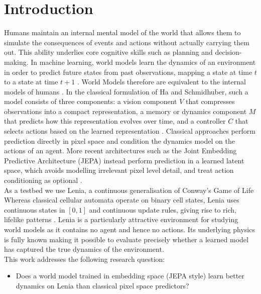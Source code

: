 \section{Introduction}
Humans maintain an internal mental model of the world that allows them to simulate the consequences of events and actions without actually carrying them out.
This ability underlies core cognitive skills such as planning and decision-making.
In machine learning, world models learn the dynamics of an environment in order to predict future states from past observations, mapping a state at time $t$ to a state at time $t+1$ \parencite{https://doi.org/10.5281/zenodo.1207631}.
World Models therefore are equivalent to the internal models of humans \parencite{lecun2022path}.
In the classical formulation of Ha and Schmidhuber, such a model consists of three components: a vision component $V$ that compresses observations into a compact representation, a memory or dynamics component $M$ that predicts how this representation evolves over time, and a controller $C$ that selects actions based on the learned representation \parencite{https://doi.org/10.5281/zenodo.1207631}.
Classical approaches perform prediction directly in pixel space and condition the dynamics model on the actions of an agent.
More recent architectures such as the Joint Embedding Predictive Architecture (JEPA) instead perform prediction in a learned latent space, which avoids modelling irrelevant pixel level detail, and treat action conditioning as optional \parencite{lecun2022path}.
\\

As a testbed we use Lenia, a continuous generalisation of Conway's Game of Life \parencite{Chan2019Lenia, 9dca666c-8536-3d47-b0e4-6be2acc6bf4e}
Whereas classical cellular automata operate on binary cell states, Lenia uses continuous states in $[0,1]$ and continuous update rules, giving rise to rich, lifelike patterns \parencite{Chan2019Lenia}.
Lenia is a particularly attractive environment for studying world models as it contains no agent and hence no actions.
Its underlying physics is fully known making it possible to evaluate precisely whether a learned model has captured the true dynamics of the environment.
\\

This work addresses the following research question:
\begin{itemize}
    \item Does a world model trained in embedding space (JEPA style) learn better dynamics on Lenia than classical pixel space predictors?
\end{itemize}

